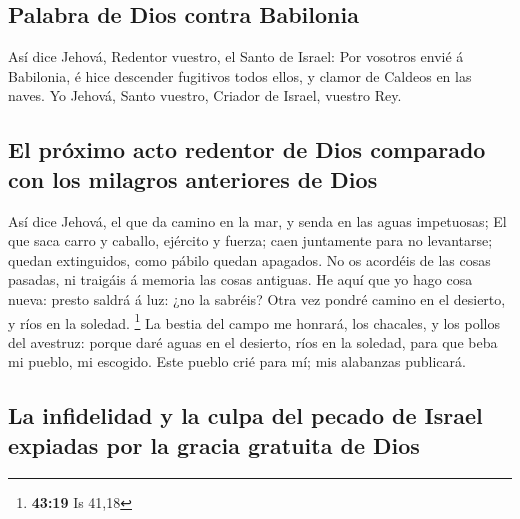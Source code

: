 \hypertarget{palabra-de-dios-contra-babilonia}{%
\subsection{Palabra de Dios contra
Babilonia}\label{palabra-de-dios-contra-babilonia}}

 Así dice Jehová, Redentor vuestro, el Santo de Israel:
Por vosotros envié á Babilonia, é hice descender fugitivos todos ellos,
y clamor de Caldeos en las naves.  Yo Jehová, Santo
vuestro, Criador de Israel, vuestro Rey.

\hypertarget{el-pruxf3ximo-acto-redentor-de-dios-comparado-con-los-milagros-anteriores-de-dios}{%
\subsection{El próximo acto redentor de Dios comparado con los milagros
anteriores de
Dios}\label{el-pruxf3ximo-acto-redentor-de-dios-comparado-con-los-milagros-anteriores-de-dios}}

 Así dice Jehová, el que da camino en la mar, y senda en
las aguas impetuosas;  El que saca carro y caballo,
ejército y fuerza; caen juntamente para no levantarse; quedan
extinguidos, como pábilo quedan apagados.  No os acordéis
de las cosas pasadas, ni traigáis á memoria las cosas antiguas.
 He aquí que yo hago cosa nueva: presto saldrá á luz: ¿no
la sabréis? Otra vez pondré camino en el desierto, y ríos en la soledad.
\footnote{\textbf{43:19} Is 41,18}  La bestia del campo
me honrará, los chacales, y los pollos del avestruz: porque daré aguas
en el desierto, ríos en la soledad, para que beba mi pueblo, mi
escogido.  Este pueblo crié para mí; mis alabanzas
publicará.

\hypertarget{la-infidelidad-y-la-culpa-del-pecado-de-israel-expiadas-por-la-gracia-gratuita-de-dios}{%
\subsection{La infidelidad y la culpa del pecado de Israel expiadas por
la gracia gratuita de
Dios}\label{la-infidelidad-y-la-culpa-del-pecado-de-israel-expiadas-por-la-gracia-gratuita-de-dios}}

